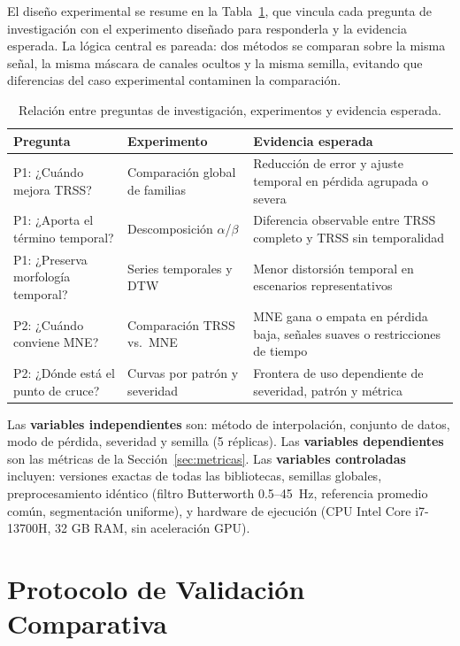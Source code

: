 El diseño experimental se resume en la Tabla~\ref{tab:research_questions_experiments}, que vincula cada pregunta de investigación con el experimento diseñado para responderla y la evidencia esperada. La lógica central es pareada: dos métodos se comparan sobre la misma señal, la misma máscara de canales ocultos y la misma semilla, evitando que diferencias del caso experimental contaminen la comparación.
\begin{table}[htbp]
\centering
\caption{Relación entre preguntas de investigación, experimentos y evidencia esperada.}
\label{tab:research_questions_experiments}
\small
\begin{tabular}{@{}p{3.2cm} p{3.0cm} p{5.5cm}@{}}
\toprule
Pregunta & Experimento & Evidencia esperada \\
\midrule
P1: ¿Cuándo mejora TRSS? & Comparación global de familias & Reducción de error y ajuste temporal en pérdida agrupada o severa \\
P1: ¿Aporta el término temporal? & Descomposición $\alpha$/$\beta$ & Diferencia observable entre TRSS completo y TRSS sin temporalidad \\
P1: ¿Preserva morfología temporal? & Series temporales y DTW & Menor distorsión temporal en escenarios representativos \\
P2: ¿Cuándo conviene MNE? & Comparación TRSS vs.\ MNE & MNE gana o empata en pérdida baja, señales suaves o restricciones de tiempo \\
P2: ¿Dónde está el punto de cruce? & Curvas por patrón y severidad & Frontera de uso dependiente de severidad, patrón y métrica \\
\bottomrule
\end{tabular}
\end{table}

Las \textbf{variables independientes} son: método de interpolación, conjunto de datos, modo de pérdida, severidad y semilla (5 réplicas). Las \textbf{variables dependientes} son las métricas de la Sección~\ref{sec:metricas}. Las \textbf{variables controladas} incluyen: versiones exactas de todas las bibliotecas, semillas globales, preprocesamiento idéntico (filtro Butterworth 0.5--45~Hz, referencia promedio común, segmentación uniforme), y hardware de ejecución (CPU Intel Core i7-13700H, 32 GB RAM, sin aceleración GPU).

\section{Protocolo de Validación Comparativa}
\label{sec:confirmatory}

